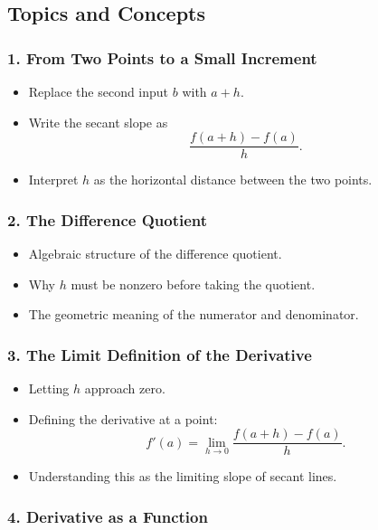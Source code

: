 \documentclass{article}
\begin{document}
\subsection*{Topics and Concepts}

\subsubsection*{1. From Two Points to a Small Increment}

\begin{itemize}
    \item Replace the second input $b$ with $a+h$.
    \item Write the secant slope as
    \[
        \frac{f(a+h)-f(a)}{h}.
    \]
    \item Interpret $h$ as the horizontal distance between the two points.
\end{itemize}

\subsubsection*{2. The Difference Quotient}

\begin{itemize}
    \item Algebraic structure of the difference quotient.
    \item Why $h$ must be nonzero before taking the quotient.
    \item The geometric meaning of the numerator and denominator.
\end{itemize}

\subsubsection*{3. The Limit Definition of the Derivative}

\begin{itemize}
    \item Letting $h$ approach zero.
    \item Defining the derivative at a point:
    \[
        f'(a)=
        \lim_{h\to0}
        \frac{f(a+h)-f(a)}{h}.
    \]
    \item Understanding this as the limiting slope of secant lines.
\end{itemize}

\subsubsection*{4. Derivative as a Function}
\end{document}

